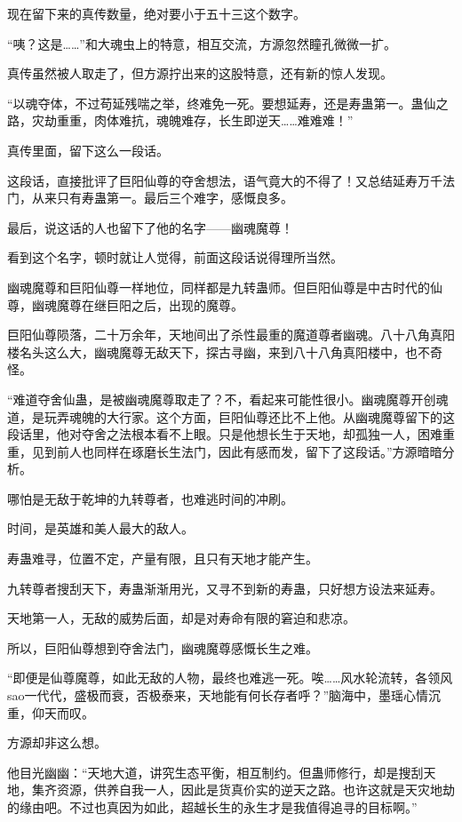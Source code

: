 \begin{this_body}
现在留下来的真传数量，绝对要小于五十三这个数字。

“咦？这是……”和大魂虫上的特意，相互交流，方源忽然瞳孔微微一扩。

真传虽然被人取走了，但方源拧出来的这股特意，还有新的惊人发现。

“以魂夺体，不过苟延残喘之举，终难免一死。要想延寿，还是寿蛊第一。蛊仙之路，灾劫重重，肉体难抗，魂魄难存，长生即逆天……难难难！”

真传里面，留下这么一段话。

这段话，直接批评了巨阳仙尊的夺舍想法，语气竟大的不得了！又总结延寿万千法门，从来只有寿蛊第一。最后三个难字，感慨良多。

最后，说这话的人也留下了他的名字——幽魂魔尊！

看到这个名字，顿时就让人觉得，前面这段话说得理所当然。

幽魂魔尊和巨阳仙尊一样地位，同样都是九转蛊师。但巨阳仙尊是中古时代的仙尊，幽魂魔尊在继巨阳之后，出现的魔尊。

巨阳仙尊陨落，二十万余年，天地间出了杀性最重的魔道尊者幽魂。八十八角真阳楼名头这么大，幽魂魔尊无敌天下，探古寻幽，来到八十八角真阳楼中，也不奇怪。

“难道夺舍仙蛊，是被幽魂魔尊取走了？不，看起来可能性很小。幽魂魔尊开创魂道，是玩弄魂魄的大行家。这个方面，巨阳仙尊还比不上他。从幽魂魔尊留下的这段话里，他对夺舍之法根本看不上眼。只是他想长生于天地，却孤独一人，困难重重，见到前人也同样在琢磨长生法门，因此有感而发，留下了这段话。”方源暗暗分析。

哪怕是无敌于乾坤的九转尊者，也难逃时间的冲刷。

时间，是英雄和美人最大的敌人。

寿蛊难寻，位置不定，产量有限，且只有天地才能产生。

九转尊者搜刮天下，寿蛊渐渐用光，又寻不到新的寿蛊，只好想方设法来延寿。

天地第一人，无敌的威势后面，却是对寿命有限的窘迫和悲凉。

所以，巨阳仙尊想到夺舍法门，幽魂魔尊感慨长生之难。

“即便是仙尊魔尊，如此无敌的人物，最终也难逃一死。唉……风水轮流转，各领风sao一代代，盛极而衰，否极泰来，天地能有何长存者呼？”脑海中，墨瑶心情沉重，仰天而叹。

方源却非这么想。

他目光幽幽：“天地大道，讲究生态平衡，相互制约。但蛊师修行，却是搜刮天地，集齐资源，供养自我一人，因此是货真价实的逆天之路。也许这就是天灾地劫的缘由吧。不过也真因为如此，超越长生的永生才是我值得追寻的目标啊。”


\end{this_body}
